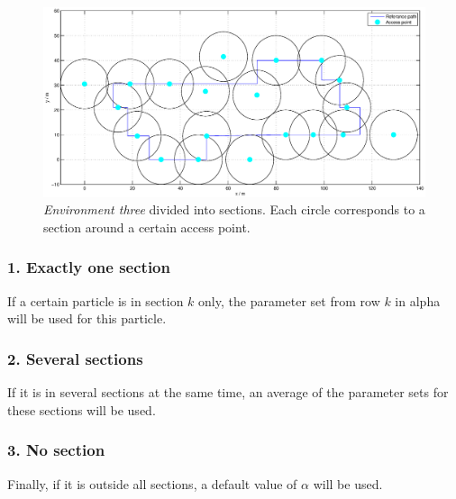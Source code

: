 \documentclass{LTHthesis}
\begin{document}
\begin{figure}[!hbt]

\includegraphics[width=1\textwidth ]{images/adapt_parameters/alpha_sections}
\caption{\emph{Environment three} divided into sections. Each circle corresponds to a section around a certain access point.}\label{alpha_sections}
\end{figure}


\subsubsection{1. Exactly one section}
If a certain particle is in section $k$ only, 
the parameter set from row $k$ in alpha will be used for this particle. 

\subsubsection{2. Several sections}
If it is in several sections at the same time, an average of the parameter sets for these sections will be used.

\subsubsection{3. No section}
Finally, if it is outside all sections, a default value of $\alpha$ will be used.
\end{document}
